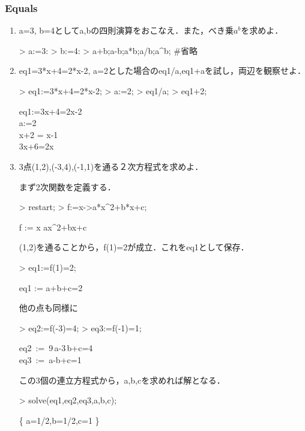\subsubsection{Equals}
\begin{enumerate}
\item a=3, b=4としてa,bの四則演算をおこなえ．また，べき乗$a^b$を求めよ．
\begin{MapleInput}
> a:=3:
> b:=4:
> a+b;a-b;a*b;a/b;a^b;      #省略
\end{MapleInput}

\item eq1=3*x+4=2*x-2, a=2とした場合のeq1/a,eq1+aを試し，両辺を観察せよ．
\begin{MapleInput}
> eq1:=3*x+4=2*x-2;
> a:=2;
> eq1/a;
> eq1+2;
\end{MapleInput}
\begin{MapleOutputGather}
eq1:=3x+4=2x-2 \notag \\
a:=2 \notag \\
x+2 = x-1 \notag \\
3x+6=2x
\end{MapleOutputGather}

\item 3点(1,2),(-3,4),(-1,1)を通る２次方程式を求めよ．

まず2次関数を定義する．
\begin{MapleInput}
> restart;
> f:=x->a*x^2+b*x+c;
\end{MapleInput}
\begin{MapleOutput}
f := x \mapsto ax^2+bx+c
\end{MapleOutput}
(1,2)を通ることから，f(1)=2が成立．これをeq1として保存．
\begin{MapleInput}
> eq1:=f(1)=2;
\end{MapleInput}
\begin{MapleOutput}
eq1 := a+b+c=2
\end{MapleOutput}
他の点も同様に
\begin{MapleInput}
> eq2:=f(-3)=4;
> eq3:=f(-1)=1;
\end{MapleInput}
\begin{MapleOutputGather}
eq2\, := \,9\,a-3\,b+c=4 \notag\\
eq3\, := \,a-b+c=1 \notag
\end{MapleOutputGather}

この3個の連立方程式から，a,b,cを求めれば解となる．
\begin{MapleInput}
> solve({eq1,eq2,eq3},{a,b,c});
\end{MapleInput}
\begin{MapleOutput}
\left\{ a=1/2,b=1/2,c=1 \right\}
\end{MapleOutput}


\end{enumerate}
